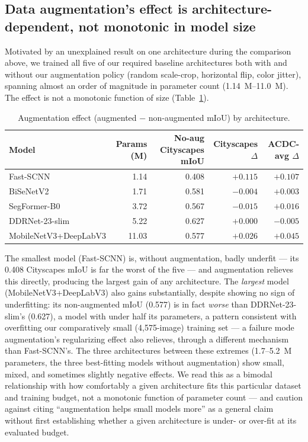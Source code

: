 \documentclass[a4paper,review,12pt]{elsarticle}
\begin{document}
\subsection{Data augmentation's effect is architecture-dependent, not monotonic in model size}
\label{sec:aug}

Motivated by an unexplained result on one architecture during the comparison
above, we trained all five of our required baseline architectures both with
and without our augmentation policy (random scale-crop, horizontal flip,
color jitter), spanning almost an order of magnitude in parameter count
(1.14~M--11.0~M). The effect is not a monotonic function of size
(Table~\ref{tab:aug}).

\begin{table}[h]
\centering
\caption{Augmentation effect (augmented $-$ non-augmented mIoU) by architecture.}
\label{tab:aug}
\begin{tabular}{lrrrr}
\toprule
Model & Params (M) & No-aug Cityscapes mIoU & Cityscapes $\Delta$ & ACDC-avg $\Delta$ \\
\midrule
Fast-SCNN                & 1.14  & 0.408 & $\mathbf{+0.115}$ & $\mathbf{+0.107}$ \\
BiSeNetV2                & 1.71  & 0.581 & $-0.004$ & $+0.003$ \\
SegFormer-B0              & 3.72  & 0.567 & $-0.015$ & $+0.016$ \\
DDRNet-23-slim            & 5.22  & 0.627 & $+0.000$ & $-0.005$ \\
MobileNetV3+DeepLabV3     & 11.03 & 0.577 & $\mathbf{+0.026}$ & $\mathbf{+0.045}$ \\
\bottomrule
\end{tabular}
\end{table}

The smallest model (Fast-SCNN) is, without augmentation, badly underfit ---
its 0.408 Cityscapes mIoU is far the worst of the five --- and augmentation
relieves this directly, producing the largest gain of any architecture. The
\emph{largest} model (MobileNetV3+DeepLabV3) also gains substantially, despite
showing no sign of underfitting: its non-augmented mIoU (0.577) is in fact
\emph{worse} than DDRNet-23-slim's (0.627), a model with under half its
parameters, a pattern consistent with overfitting our comparatively small
(4{,}575-image) training set --- a failure mode augmentation's regularizing
effect also relieves, through a different mechanism than Fast-SCNN's. The
three architectures between these extremes (1.7--5.2~M parameters, the three
best-fitting models without augmentation) show small, mixed, and sometimes
slightly negative effects. We read this as a bimodal relationship with how
comfortably a given architecture fits this particular dataset and training
budget, not a monotonic function of parameter count --- and caution against
citing ``augmentation helps small models more'' as a general claim without
first establishing whether a given architecture is under- or over-fit at its
evaluated budget.
\end{document}
